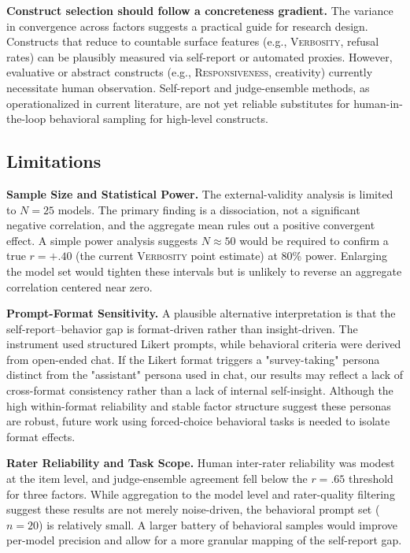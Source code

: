 \documentclass[11pt]{article}
\newcommand{\factorname}[1]{\textsc{#1}}
\begin{document}
\textbf{Construct selection should follow a concreteness gradient.}
The variance in convergence across factors suggests a practical guide for research design. Constructs that reduce to countable surface features (e.g., \factorname{Verbosity}, refusal rates) can be plausibly measured via self-report or automated proxies. However, evaluative or abstract constructs (e.g., \factorname{Responsiveness}, creativity) currently necessitate human observation. Self-report and judge-ensemble methods, as operationalized in current literature, are not yet reliable substitutes for human-in-the-loop behavioral sampling for high-level constructs.

\subsection{Limitations}
\label{sec:discussion-limitations}

\textbf{Sample Size and Statistical Power.}
The external-validity analysis is limited to $N = 25$ models. The primary finding is a dissociation, not a significant negative correlation, and the aggregate mean rules out a positive convergent effect. A simple power analysis suggests $N \approx 50$ would be required to confirm a true $r = +.40$ (the current \factorname{Verbosity} point estimate) at 80\% power. Enlarging the model set would tighten these intervals but is unlikely to reverse an aggregate correlation centered near zero.

\textbf{Prompt-Format Sensitivity.}
A plausible alternative interpretation is that the self-report--behavior gap is format-driven rather than insight-driven. The instrument used structured Likert prompts, while behavioral criteria were derived from open-ended chat. If the Likert format triggers a "survey-taking" persona distinct from the "assistant" persona used in chat, our results may reflect a lack of cross-format consistency rather than a lack of internal self-insight. Although the high within-format reliability and stable factor structure suggest these personas are robust, future work using forced-choice behavioral tasks is needed to isolate format effects.

\textbf{Rater Reliability and Task Scope.}
Human inter-rater reliability was modest at the item level, and judge-ensemble agreement fell below the $r = .65$ threshold for three factors. While aggregation to the model level and rater-quality filtering suggest these results are not merely noise-driven, the behavioral prompt set ($n=20$) is relatively small. A larger battery of behavioral samples would improve per-model precision and allow for a more granular mapping of the self-report gap.
\end{document}
